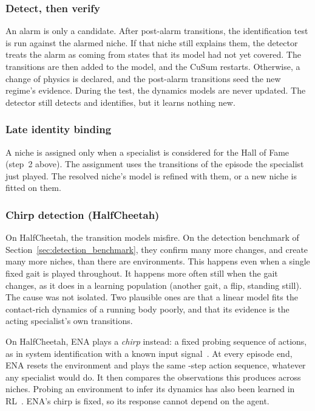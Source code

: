 \subsubsection{Detect, then verify}
An alarm is only a candidate. After  post-alarm transitions, the identification test is run against the alarmed niche. If that niche still explains them, the detector treats the alarm as coming from states that its model had not yet covered. The transitions are then added to the model, and the CuSum restarts. Otherwise, a change of physics is declared, and the post-alarm transitions seed the new regime's evidence. During the test, the dynamics models are never updated. The detector still detects and identifies, but it learns nothing new.

\subsubsection{Late identity binding}
A niche is assigned only when a specialist is considered for the Hall of Fame (step~2 above). The assignment uses the transitions of the episode the specialist just played. The resolved niche's model is refined with them, or a new niche is fitted on them.

\subsubsection{Chirp detection (HalfCheetah)}
\label{sec:chirp}
On HalfCheetah, the transition models misfire. On the detection benchmark of Section~\ref{sec:detection_benchmark}, they confirm many more changes, and create many more niches, than there are environments. This happens even when a single fixed gait is played throughout. It happens more often still when the gait changes, as it does in a learning population (another gait, a flip, standing still). The cause was not isolated. Two plausible ones are that a linear model fits the contact-rich dynamics of a running body poorly, and that its evidence is the acting specialist's own transitions.

On HalfCheetah, ENA plays a \textit{chirp} instead: a fixed probing sequence of actions, as in system identification with a known input signal~\citep{ljung1999system}. At every episode end, ENA resets the environment and plays the same -step action sequence, whatever any specialist would do. It then compares the observations this produces across niches. Probing an environment to infer its dynamics has also been learned in RL~\citep{zhou2019environment}. ENA's chirp is fixed, so its response cannot depend on the agent.


